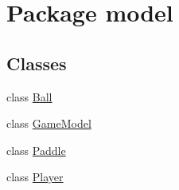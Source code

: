 \hypertarget{namespacemodel}{}\section{Package model}
\label{namespacemodel}
\subsection*{Classes}
\begin{DoxyCompactItemize}
\item 
class \hyperlink{classmodel_1_1_ball}{Ball}
\item 
class \hyperlink{classmodel_1_1_game_model}{Game\+Model}
\item 
class \hyperlink{classmodel_1_1_paddle}{Paddle}
\item 
class \hyperlink{classmodel_1_1_player}{Player}
\end{DoxyCompactItemize}
